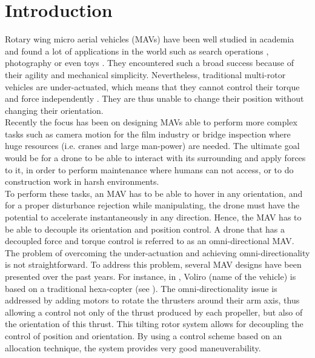 \chapter{Introduction}
\label{sec:introduction}

Rotary wing micro aerial vehicles (MAVs) have been well studied in academia
and found a lot of applications in the world such as search operations
\citep{silvagni_multipurpose_2017}, photography \citep{noauthor_dji_nodate} or
even toys \citep{noauthor_aura_nodate}. They encountered such a broad success because
of their agility and mechanical simplicity. Nevertheless, traditional multi-rotor
vehicles are under-actuated, which means that they cannot control their torque
and force independently \citep{brescianini_design_2016}. They are thus unable to
change their position without changing their orientation. \\
Recently the focus has been on designing MAVs able to perform more complex
tasks such as camera motion for the film industry \citep{kamel_voliro:_2018} or
bridge inspection where huge resources (i.e. cranes and large man-power)
are needed. The ultimate goal would be for a drone to be able to interact with
its surrounding and apply forces to it, in order to perform maintenance where
humans can not access, or to do construction work in harsh environments. \\
To perform these tasks, an MAV has to be able to hover in any orientation, and for a
proper disturbance rejection while manipulating, the drone must have the potential
to accelerate instantaneously in any direction. Hence, the MAV has to be able to
decouple its orientation and position control. A drone that has a decoupled
force and torque control is referred to as an omni-directional MAV. \\
The problem of overcoming the under-actuation and achieving omni-directionality
is not straightforward. To address this problem, several MAV designs have been
presented over the past years. For instance, in \citep{kamel_voliro:_2018}, Voliro
(name of the vehicle) is based on a traditional hexa-copter (see ).
The omni-directionality issue is addressed by adding motors to rotate the
thrusters around their arm axis, thus allowing a control not only of the thrust
produced by each propeller, but also of the orientation of this thrust. This
tilting rotor system allows for decoupling the control of position and orientation.
By using a control scheme based on an allocation technique, the system provides
very good maneuverability.


